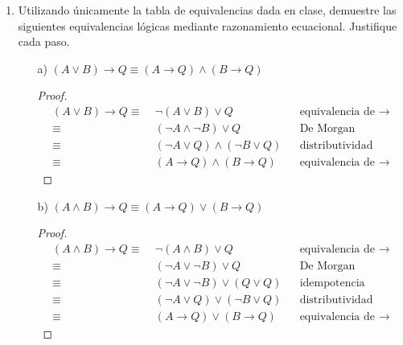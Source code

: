 \documentclass[letterpaper,11pt]{article}
\begin{document}
\begin{enumerate}
    \item Utilizando únicamente la tabla de equivalencias dada en clase, 
    demuestre las siguientes equivalencias lógicas mediante razonamiento 
    ecuacional. Justifique cada paso.

    \begin{itemize}
        \item[a)] $(A \lor B) → Q ≡ (A → Q) \land (B → Q)$ 
        \begin{proof}
            \begin{align*}
                (A \lor B) → Q 
                ≡& \; \neg (A \lor B) \lor Q  
                && \text{equivalencia de $→$} \\
                ≡& \; (\neg A \land \neg B) \lor Q 
                && \text{De Morgan} \\ 
                ≡& \; (\neg A \lor Q) \land (\neg B \lor Q)
                && \text{distributividad} \\ 
                ≡& \; (A → Q) \land (B → Q)
                && \text{equivalencia de $→$} 
            \end{align*}
        \end{proof}

        \item[b)] $(A \land B) → Q ≡ (A → Q) \lor (B → Q)$ 
        \begin{proof}
            \begin{align*}
                (A \land B) → Q 
                ≡& \; \neg (A \land B) \lor Q
                && \text{equivalencia de $→$} \\ 
                ≡& \; (\neg A \lor \neg B) \lor Q
                && \text{De Morgan} \\
                ≡& \; (\neg A \lor \neg B) \lor (Q \lor Q)
                && \text{idempotencia} \\ 
                ≡& \; (\neg A \lor Q) \lor (\neg B \lor Q)
                && \text{distributividad} \\
                ≡& \; (A → Q) \lor (B → Q)
                && \text{equivalencia de $→$}
            \end{align*}
        \end{proof}


\end{itemize}
\end{enumerate}
\end{document}
